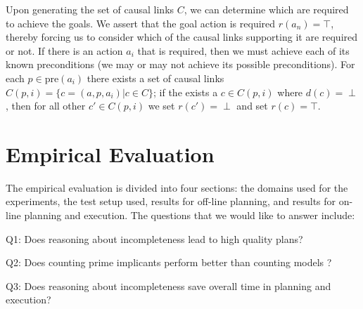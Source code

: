 \documentclass{article}
\newenvironment{packed_itemize}{
\begin{itemize}
  \setlength{\itemsep}{1pt}
  \setlength{\parskip}{0pt}
  \setlength{\parsep}{0pt}
}{\end{itemize}}
\begin{document}
Upon generating the set of causal links $C$, we can determine which are required to achieve the goals.  We assert that the goal action is required $r(a_n) = \top$, thereby forcing us to consider which of the causal links supporting it are required or not.  If there is an action $a_i$ that is required, then we must achieve each of its known preconditions (we may or may not achieve its possible preconditions).  For each $p \in \text{pre}(a_i)$ there exists a set of causal links $C(p, i) = \{c = (a, p, a_i) | c \in C\}$; if the exists a $c \in C(p, i)$ where $d(c) = \perp$, then for all other $c' \in C(p, i)$ we set $r(c') = \perp$ and set $r(c) = \top$.  

\section{Empirical Evaluation}\label{sec:empirical}
%
The empirical evaluation is divided into four sections:  the domains used for the experiments, the test setup used, results for off-line planning, and results for on-line planning and execution.  The questions that we would like to answer include: 
\begin{packed_itemize}
\item Q1: Does reasoning about incompleteness lead to high quality plans?
\item Q2: Does counting prime implicants perform better than counting models ?
\item Q3: Does reasoning about incompleteness save overall time in planning and execution?
\end{packed_itemize}
\end{document}
